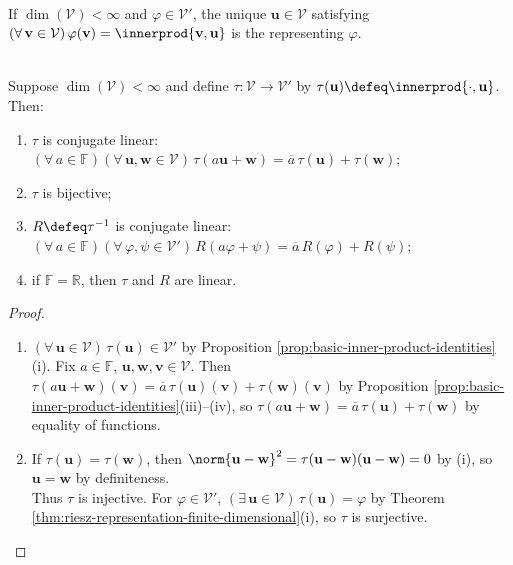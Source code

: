 \begin{definition} \label{def:riesz-vector} \\
If $\dim(\mathcal{V})<\infty$ and $\varphi\in\mathcal{V}'$, the unique $\mathbf{u}\in\mathcal{V}$ satisfying $(\forall\,\mathbf{v}\in\mathcal{V})\,\varphi(\mathbf{v})=\innerprod{\mathbf{v},\mathbf{u}}$ is the  representing $\varphi$.
\end{definition}

\begin{theorem} \label{thm:riesz-map-conjugate-isomorphism} \\
Suppose $\dim(\mathcal{V})<\infty$ and define $\tau:\mathcal{V}\to\mathcal{V}'$ by $\tau(\mathbf{u})\defeq\innerprod{\cdot,\mathbf{u}}$. Then:
\begin{enumerate}[label=(\roman*)]
\setlength{\itemsep}{0pt}
\item $\tau$ is conjugate linear: $(\forall\,a\in\mathbb{F})(\forall\,\mathbf{u},\mathbf{w}\in\mathcal{V})\,\tau(a\mathbf{u}+\mathbf{w})=\overline{a}\,\tau(\mathbf{u})+\tau(\mathbf{w})$;
\item $\tau$ is bijective;
\item $R\defeq\tau^{-1}$ is conjugate linear: $(\forall\,a\in\mathbb{F})(\forall\,\varphi,\psi\in\mathcal{V}')\,R(a\varphi+\psi)=\overline{a}\,R(\varphi)+R(\psi)$;
\item if $\mathbb{F}=\mathbb{R}$, then $\tau$ and $R$ are linear.
\end{enumerate}
\begin{proof}
\begin{enumerate}[label=(\roman*)]
\setlength{\itemsep}{0pt}
\item $(\forall\,\mathbf{u}\in\mathcal{V})\,\tau(\mathbf{u})\in\mathcal{V}'$ by Proposition \ref{prop:basic-inner-product-identities}(i). Fix $a\in\mathbb{F}$, $\mathbf{u},\mathbf{w},\mathbf{v}\in\mathcal{V}$. Then $\tau(a\mathbf{u}+\mathbf{w})(\mathbf{v})=\overline{a}\,\tau(\mathbf{u})(\mathbf{v})+\tau(\mathbf{w})(\mathbf{v})$ by Proposition \ref{prop:basic-inner-product-identities}(iii)--(iv), so $\tau(a\mathbf{u}+\mathbf{w})=\overline{a}\,\tau(\mathbf{u})+\tau(\mathbf{w})$ by equality of functions.
\item If $\tau(\mathbf{u})=\tau(\mathbf{w})$, then $\norm{\mathbf{u}-\mathbf{w}}^2=\tau(\mathbf{u}-\mathbf{w})(\mathbf{u}-\mathbf{w})=0$ by (i), so $\mathbf{u}=\mathbf{w}$ by definiteness.\\
Thus $\tau$ is injective. For $\varphi\in\mathcal{V}'$, $(\exists\,\mathbf{u}\in\mathcal{V})\,\tau(\mathbf{u})=\varphi$ by Theorem \ref{thm:riesz-representation-finite-dimensional}(i), so $\tau$ is surjective.

\end{enumerate}
\end{proof}
\end{theorem}
